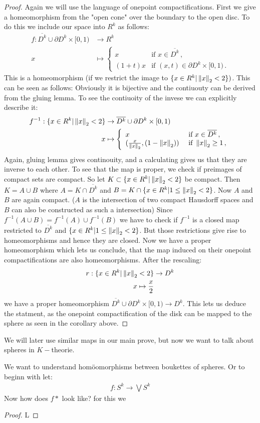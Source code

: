 \begin{proof}
	Again we will use the language of onepoint compactifications. First we give a homeomorphism from the "open cone" over the boundary to the open disc. To do this we include our space into $R^k$ as follows:
	\begin{align*}
	f:	\overline{D^k}\cup \partial D^k \times [0,1) &\to R^{k}\\
		x								 &\mapsto
		 \left\{ \begin{array}{ll}
		 	x & \text{if } x \in \overline{D^k} \, , \\
		 	(1+t)x& \text{if } (x,t)\in \partial D^k \times [0,1) \, . 
		 \end{array}
		 \right.
	\end{align*} This is a homeomorphism (if we restrict the image to $\{x\in R^k| \left\lVert x\right\rVert_2<2\})$. This can be seen as follows:
	Obviously it is bijective and the contiuouty can be derived from the gluing lemma. To see the contiuoity of the invese we can explicitly describe it:
\begin{align*}
	f^{-1}: \{x\in R^k| \left\lVert x\right\rVert_2<2\}  &\to    \overline{D^k}\cup \partial D^k \times [0,1) \\
	x 									&\mapsto \left\{ 
	\begin{array}{ll}
		x & \text{ if } x\in \overline{D^k} \,,  \\
		(\frac{x}{\left\lVert x\right\rVert_2},(1-\left\lVert x\right\rVert_2)) & \text{ if } \left\lVert x\right\rVert_2\geq 1 \,,
	\end{array}
	\right.
\end{align*} Again, gluing lemma gives continouity, and a calculating gives us that they are inverse to each other. To see that the map is proper, we check if preimages of compact sets are compact. So let $K\subset \{x\in R^k| \left\lVert x\right\rVert_2<2\}$ be compact. Then $K=A\cup B$ where $A= K\cap \overline{D^k}$ and $B=K\cap \{x\in R^k| 1\leq \left\lVert x\right\rVert_2<2\}$. Now $A$ and $B$ are again compact. ($A$ is the intersection of two compact Hausdorff spaces and $B$ can also be constructed as such a intersection) Since $f^{-1}(A\cup B)=f^{-1}(A)\cup f^{-1}(B)$ we have to check if $f^{-1}$ is a closed map restricted to $\overline{D^k}$ and $\{x\in R^k| 1\leq \left\lVert x\right\rVert_2<2\}$. But those restrictions give rise to homeomorphisms and hence they are closed. 
Now we have a proper homeomorphism which lets us conclude, that the map induced on their onepoint compactifications are also homeomorphisms.  After the rescaling:
\begin{align*}
	r: \{x\in R^k| \left\lVert x\right\rVert_2<2\} & \to D^k\\
	x\mapsto \frac{x}{2}
\end{align*} we have a proper homeomorphism $\overline{D^k}\cup \partial D^k \times [0,1) \to D^k$.
This lets us deduce the statment, as the onepoint compactification of the disk can be mapped to the sphere as seen in the corollary above.
\end{proof}
We will later use similar maps in our main prove, but now we want to talk about spheres in $K-$theorie. 

\begin{corollary}
We want to understand homöomorphisms between boukettes of spheres. Or to beginn with let:
\begin{align*}
	f:S^k\to \bigvee S^k
\end{align*}
Now how does $f*$ look like? for this we
\end{corollary}
\begin{proof}
	L
\end{proof}
